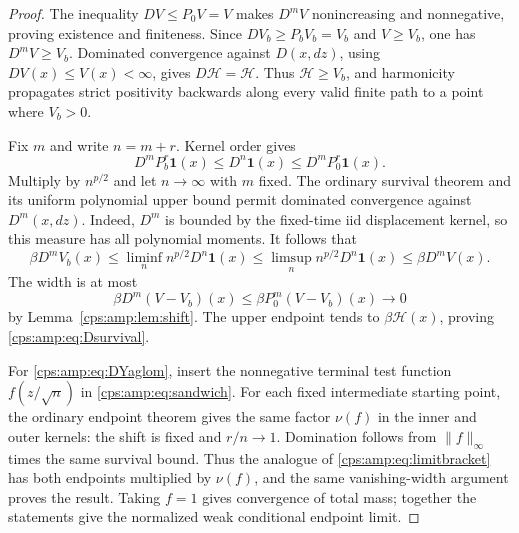 \documentclass[11pt,letterpaper]{article}
\numberwithin{equation}{section}
\theoremstyle{remark}\newtheorem{remark}[theorem]{Remark}
\newcommand{\one}{\mathbf 1}
\newcommand{\norm}[1]{\lVert#1\rVert}
\begin{document}
\begin{proof}
The inequality $DV\le P_0V=V$ makes $D^mV$ nonincreasing and nonnegative, proving existence and finiteness. Since $DV_b\ge P_bV_b=V_b$ and $V\ge V_b$, one has $D^mV\ge V_b$. Dominated convergence against $D(x,dz)$, using $DV(x)\le V(x)<\infty$, gives $D\mathcal H=\mathcal H$. Thus $\mathcal H\ge V_b$, and harmonicity propagates strict positivity backwards along every valid finite path to a point where $V_b>0$.

Fix $m$ and write $n=m+r$. Kernel order gives
\begin{equation}\label{cps:amp:eq:sandwich}
 D^mP_b^r\one(x)\le D^n\one(x)\le D^mP_0^r\one(x).
\end{equation}
Multiply by $n^{p/2}$ and let $n\to\infty$ with $m$ fixed. The ordinary survival theorem and its uniform polynomial upper bound permit dominated convergence against $D^m(x,dz)$. Indeed, $D^m$ is bounded by the fixed-time iid displacement kernel, so this measure has all polynomial moments. It follows that
\begin{equation}\label{cps:amp:eq:limitbracket}
 \beta D^mV_b(x)
 \le\liminf_n n^{p/2}D^n\one(x)
 \le\limsup_n n^{p/2}D^n\one(x)
 \le\beta D^mV(x).
\end{equation}
The width is at most
\begin{equation}
 \beta D^m(V-V_b)(x)\le\beta P_0^m(V-V_b)(x)\longrightarrow0
\end{equation}
by Lemma~\ref{cps:amp:lem:shift}. The upper endpoint tends to $\beta\mathcal H(x)$, proving \eqref{cps:amp:eq:Dsurvival}.

For \eqref{cps:amp:eq:DYaglom}, insert the nonnegative terminal test function $f(z/\sqrt n)$ in \eqref{cps:amp:eq:sandwich}. For each fixed intermediate starting point, the ordinary endpoint theorem gives the same factor $\nu(f)$ in the inner and outer kernels: the shift is fixed and $r/n\to1$. Domination follows from $\norm f_\infty$ times the same survival bound. Thus the analogue of \eqref{cps:amp:eq:limitbracket} has both endpoints multiplied by $\nu(f)$, and the same vanishing-width argument proves the result. Taking $f=1$ gives convergence of total mass; together the statements give the normalized weak conditional endpoint limit.
\end{proof}
\end{document}
